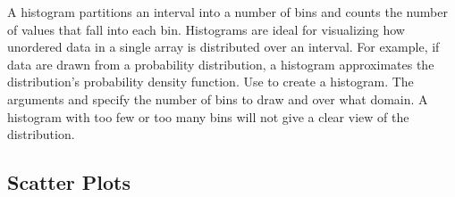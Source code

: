 A histogram partitions an interval into a number of bins and counts the number of values that fall into each bin.
Histograms are ideal for visualizing how unordered data in a single array is distributed over an interval.
For example, if data are drawn from a probability distribution, a histogram approximates the distribution's probability density function.
Use  to create a histogram.
The arguments  and  specify the number of bins to draw and over what domain.
A histogram with too few or too many bins will not give a clear view of the distribution.

\subsection*{Scatter Plots} %

